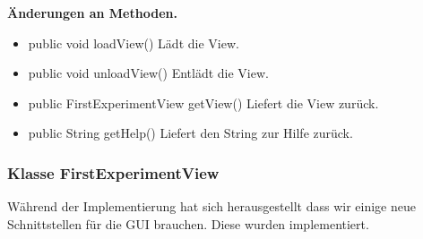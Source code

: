 \documentclass{article}
\begin{document}
    \textbf{Änderungen an Methoden.}
      \begin{itemize}
		\item public void loadView()\newline
              Lädt die View.
        \item public void unloadView()\newline
              Entlädt die View.
        \item public FirstExperimentView getView()\newline
              Liefert die View zurück.
        \item public String getHelp()\newline
              Liefert den String zur Hilfe zurück.
      \end{itemize}
	  
    \subsubsection{Klasse FirstExperimentView}
	Während der Implementierung hat sich herausgestellt dass wir einige neue Schnittstellen für die GUI brauchen. Diese wurden implementiert.\newline
           
\end{document}
